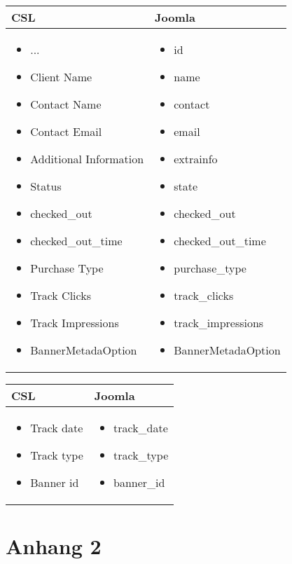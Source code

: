 \begin{minipage}{0.7\textwidth}
\begin{tabular}{|p{} | p{}|}
\hline
\textbf{CSL} & \textbf{Joomla} \\ 
\hline
\begin{itemize}
\item ...
\item  Client Name
\item  Contact Name
\item  Contact Email
\item  Additional Information
\item  Status
\item  checked\_out
\item  checked\_out\_time
\item  Purchase Type
\item  Track Clicks
\item  Track Impressions
\item BannerMetadaOption
\end{itemize}
 & 
\begin{itemize}
\item id
\item  name
\item  contact
\item  email
\item  extrainfo
\item  state
\item  checked\_out
\item  checked\_out\_time
\item  purchase\_type
\item  track\_clicks
\item  track\_impressions
\item BannerMetadaOption
\end{itemize}
\\
\hline
\end{tabular}
\end{minipage}

\begin{minipage}{0.7\textwidth}
\begin{tabular}{|p{} | p{}|}
\hline
\textbf{CSL} & \textbf{Joomla} \\ 
\hline
\begin{itemize}
\item Track date
\item Track type
\item Banner id
\end{itemize}
 & 
\begin{itemize}
\item track\_date
\item track\_type
\item banner\_id
\end{itemize}
\\
\hline
\end{tabular}
\end{minipage}
\chapter{Anhang 2}


